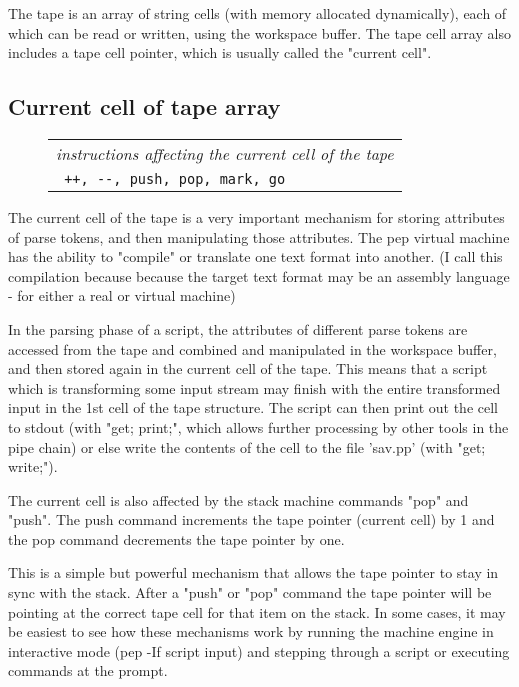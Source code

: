 \documentclass[a4paper,12pt]{article}
\begin{document}
  The tape is an array of string cells (with memory allocated dynamically),
  each of which can be read or written, using the workspace buffer.
  The tape cell array also includes a tape cell pointer, which is usually
  called the "current cell".

\subsection{Current cell of tape array}
 \begin{figure}
 \begin{tabular}{ l }
 \emph{ instructions affecting the current cell of the tape } \\ 
 \verb| ++, --, push, pop, mark, go |
 \end{tabular} 
 \end{figure}

  The current cell of the tape is a very important mechanism for storing
  attributes of parse tokens, and then manipulating those attributes. The
  pep virtual machine has the ability to "compile" or translate one text
  format into another. (I call this compilation because because the target
  text format may be an assembly language - for either a real or virtual
  machine)

  In the parsing phase of a script, the attributes of different parse tokens
  are accessed from the tape and combined and manipulated in the workspace
  buffer, and then stored again in the current cell of the tape. This means
  that a script which is transforming some input stream may finish with the
  entire transformed input in the 1st cell of the tape structure. The script
  can then print out the cell to stdout (with "get; print;", which allows
  further processing by other tools in the pipe chain) or else write the
  contents of the cell to the file 'sav.pp' (with "get; write;").

  The current cell is also affected by the stack machine commands
  "pop" and "push". The push command increments the tape pointer
  (current cell) by 1 and the pop command decrements the tape pointer
  by one.

  This is a simple but powerful mechanism that allows the tape pointer
  to stay in sync with the stack. After a "push" or "pop" command
  the tape pointer will be pointing at the correct tape cell for
  that item on the stack. In some cases, it may be easiest to see how
  these mechanisms work by running the machine engine in interactive mode
  (pep -If script input) and stepping through a script or executing
  commands at the prompt.
\end{document}
